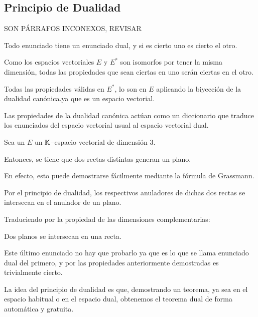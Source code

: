 \subsection{Principio de Dualidad}
SON PÁRRAFOS INCONEXOS, REVISAR

Todo enunciado tiene un enunciado dual, y si es cierto uno es cierto el otro.

Como los espacios vectoriales $E$ y $E^*$ son isomorfos por tener la misma dimensión, todas las propiedades que sean ciertas en uno serán ciertas en el otro.

Todas las propiedades válidas en $E^*$, lo son en $E$ aplicando la biyección de la dualidad canónica.ya que es un espacio vectorial.

Las propiedades de la dualidad canónica actúan como un diccionario que traduce los enunciados del espacio vectorial usual al espacio vectorial dual.

\begin{exa}
	Sea un $E$ un $\mathbb{K}$--espacio vectorial de dimensión $3$.
	
	Entonces, se tiene que dos rectas distintas generan un plano.
	
	En efecto, esto puede demostrarse fácilmente mediante la fórmula de Grassmann.
	
	Por el principio de dualidad, los respectivos anuladores de dichas dos rectas se intersecan en el anulador de un plano.
	
	Traduciendo por la propiedad de las dimensiones complementarias:
	
	Dos planos se intersecan en una recta.
	
	Este último enunciado no hay que probarlo ya que es lo que se llama enunciado dual del primero, y por las propiedades anteriormente demostradas es trivialmente cierto.
\end{exa}

La idea del principio de dualidad es que, demostrando un teorema, ya sea en el espacio habitual o en el espacio dual, obtenemos el teorema dual de forma automática y gratuita.


